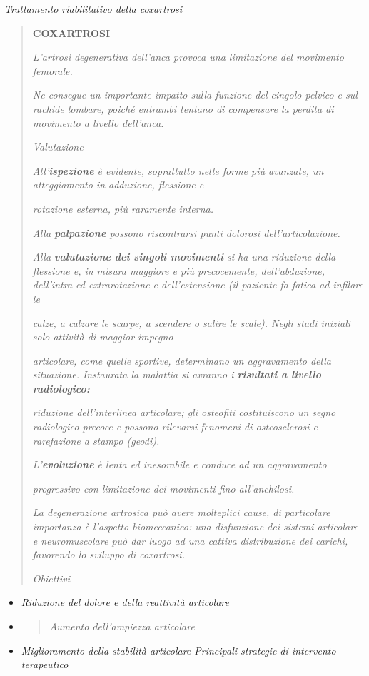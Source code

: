 \documentclass[]{article}
\date{}
\begin{document}
\emph{Trattamento riabilitativo della coxartrosi}

\begin{quote}
\textbf{COXARTROSI}

\emph{L'artrosi degenerativa dell'anca provoca una limitazione del
movimento femorale.}

\emph{Ne consegue un importante impatto sulla funzione del cingolo
pelvico e sul rachide lombare, poiché entrambi tentano di compensare la
perdita di movimento a livello dell'anca.}

\emph{\emph{Valutazione}}

\emph{All'\textbf{ispezione} è evidente, soprattutto nelle forme più
avanzate, un atteggiamento in adduzione, flessione e}

\emph{rotazione esterna, più raramente interna.}

\emph{Alla \textbf{palpazione} possono riscontrarsi punti dolorosi
dell'articolazione.}

\emph{Alla \textbf{valutazione dei singoli movimenti} si ha una
riduzione della flessione e, in misura maggiore e più precocemente,
dell'abduzione, dell'intra ed extrarotazione e dell'estensione (il
paziente fa fatica ad infilare le}

\emph{calze, a calzare le scarpe, a scendere o salire le scale). Negli
stadi iniziali solo attività di maggior impegno}

\emph{articolare, come quelle sportive, determinano un aggravamento
della situazione. Instaurata la malattia si avranno i \textbf{risultati
a livello radiologico:}}

\emph{riduzione dell'interlinea articolare; gli osteofiti costituiscono
un segno radiologico precoce e possono rilevarsi fenomeni di
osteosclerosi e rarefazione a stampo (geodi).}

\emph{L'\textbf{evoluzione} è lenta ed inesorabile e conduce ad un
aggravamento}

\emph{progressivo con limitazione dei movimenti fino all'anchilosi.}

\emph{La degenerazione artrosica può avere molteplici cause, di
particolare importanza è l'aspetto biomeccanico: una disfunzione dei
sistemi articolare e neuromuscolare può dar luogo ad una cattiva
distribuzione dei carichi, favorendo lo sviluppo di coxartrosi.}

\emph{\emph{Obiettivi}}
\end{quote}

\begin{itemize}
\item
  \emph{Riduzione del dolore e della reattività articolare}
\item
  \begin{quote}
  \emph{Aumento dell'ampiezza articolare}
  \end{quote}
\item
  \emph{Miglioramento della stabilità articolare \emph{Principali
  strategie di intervento terapeutico}}
\end{itemize}
\end{document}
